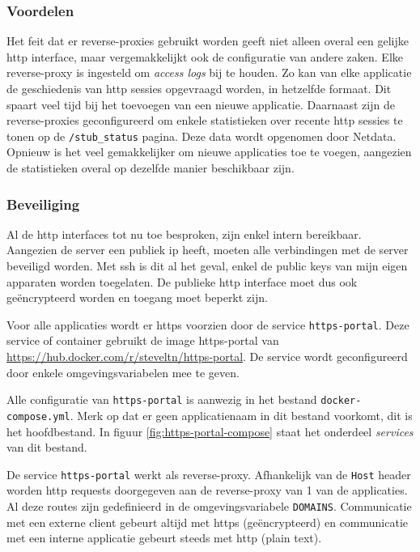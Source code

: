 \documentclass[a4paper,12pt]{report}
\begin{document}
\subsubsection{Voordelen}
Het feit dat er reverse-proxies gebruikt worden geeft niet alleen overal een gelijke http interface, maar vergemakkelijkt ook de configuratie van andere zaken.
Elke reverse-proxy is ingesteld om \emph{access logs} bij te houden.
Zo kan van elke applicatie de geschiedenis van http sessies opgevraagd worden, in hetzelfde formaat.
Dit spaart veel tijd bij het toevoegen van een nieuwe applicatie.
Daarnaast zijn de reverse-proxies geconfigureerd om enkele statistieken over recente http sessies te tonen op de \lstinline|/stub_status| pagina.
Deze data wordt opgenomen door Netdata.
Opnieuw is het veel gemakkelijker om nieuwe applicaties toe te voegen, aangezien de statistieken overal op dezelfde manier beschikbaar zijn.

\subsubsection{Beveiliging}
Al de http interfaces tot nu toe besproken, zijn enkel intern bereikbaar.
Aangezien de server een publiek ip heeft, moeten alle verbindingen met de server beveiligd worden.
Met ssh is dit al het geval, enkel de public keys van mijn eigen apparaten worden toegelaten.
De publieke http interface moet dus ook geëncrypteerd worden en toegang moet beperkt zijn.

Voor alle applicaties wordt er https voorzien door de service \lstinline|https-portal|.
Deze service of container gebruikt de image https-portal van \url{https://hub.docker.com/r/steveltn/https-portal}.
De service wordt geconfigureerd door enkele omgevingsvariabelen mee te geven.

Alle configuratie van \lstinline|https-portal| is aanwezig in het bestand \lstinline|docker-compose.yml|.
Merk op dat er geen applicatienaam in dit bestand voorkomt, dit is het hoofdbestand.
In figuur \ref{fig:https-portal-compose} staat het onderdeel \emph{services} van dit bestand.

De service \lstinline|https-portal| werkt als reverse-proxy.
Afhankelijk van de \lstinline|Host| header worden http requests doorgegeven aan de reverse-proxy van 1 van de applicaties.
Al deze routes zijn gedefinieerd in de omgevingsvariabele \lstinline|DOMAINS|.
Communicatie met een externe client gebeurt altijd met https (geëncrypteerd) en communicatie met een interne applicatie gebeurt steeds met http (plain text).
\end{document}
